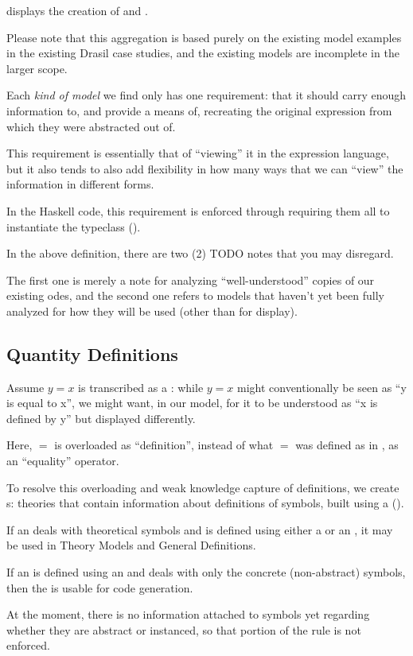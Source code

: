  displays the creation of \ModelKind{} and
\ModelKinds{}.

Please note that this aggregation is based purely on the existing model examples
in the existing Drasil case studies, and the existing models are incomplete in
the larger scope.

Each \textit{kind of model} we find only has one requirement: that it should
carry enough information to, and provide a means of, recreating the original
expression from which they were abstracted out of.

This requirement is essentially that of ``viewing'' it in the expression
language, but it also tends to also add flexibility in how many ways that we can
``view'' the information in different forms.

In the Haskell code, this requirement is enforced through requiring them all to
instantiate the \Express{} typeclass ().

\currentModelKindsHaskell{}

In the above \ModelKinds{} definition, there are two (2) TODO notes that you may
disregard.

The first one is merely a note for analyzing ``well-understood'' copies of our
existing \acsp{ode}, and the second one refers to models that haven't yet been
fully analyzed for how they will be used (other than for display).

\subsection{Quantity Definitions}

\currentQDefinitionHaskell{}

Assume \(y = x\) is transcribed as a \RelationConcept{}: while \(y = x\) might
conventionally be seen as ``y is equal to x'', we might want, in our model, for
it to be understood as ``x is defined by y'' but displayed differently.

Here, \(=\) is overloaded as ``definition'', instead of what \(=\) was defined
as in \Expr{}, as an ``equality'' operator.

To resolve this overloading and weak knowledge capture of definitions, we create
\EquationalModel{}s: theories that contain information about definitions of
symbols, built using a \QDefinition{} ().

If an \EquationalModel{} deals with theoretical symbols and is defined using
either a \ModelExpr{} or an \Expr{}, it may be used in Theory Models and General
Definitions.

If an \EquationalModel{} is defined using an \Expr{} and deals with only the
concrete (non-abstract) symbols, then the \EquationalModel{} is usable for code
generation.

At the moment, there is no information attached to symbols yet regarding whether
they are abstract or instanced, so that portion of the rule is not enforced.

